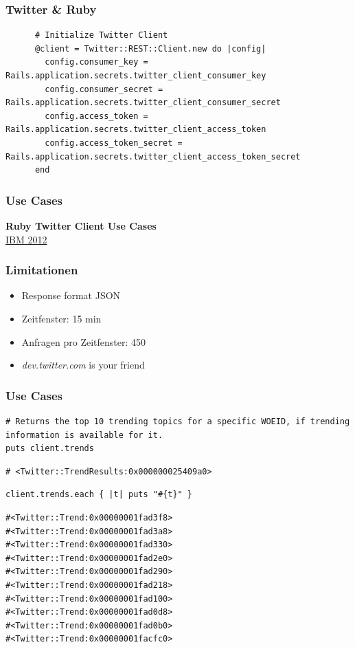 \documentclass{beamer}
\begin{document}
\begin{frame}[fragile]
  \frametitle{Twitter \& Ruby}
    \begin{lstlisting}
      # Initialize Twitter Client
      @client = Twitter::REST::Client.new do |config|
        config.consumer_key = Rails.application.secrets.twitter_client_consumer_key
        config.consumer_secret = Rails.application.secrets.twitter_client_consumer_secret
        config.access_token = Rails.application.secrets.twitter_client_access_token
        config.access_token_secret = Rails.application.secrets.twitter_client_access_token_secret
      end
    \end{lstlisting}    
\end{frame}
\begin{frame}
  \frametitle{Use Cases}\pause
  \begin{center}
    \textbf{Ruby Twitter Client Use Cases}\\
    \hyperlink{http://www.ibm.com/developerworks/library/os-dataminingrubytwitter}{IBM 2012}\pause
  \end{center}
\end{frame}

\begin{frame}
  \frametitle{Limitationen}
  \begin{itemize}
    \item Response format JSON
    \item Zeitfenster: 15 min
    \item Anfragen pro Zeitfenster: 450
    \item \textit{dev.twitter.com} is your friend
  \end{itemize}
\end{frame}

\begin{frame}[fragile]
  \frametitle{Use Cases}
  \begin{lstlisting}
# Returns the top 10 trending topics for a specific WOEID, if trending information is available for it.
puts client.trends
\end{lstlisting}\pause
\begin{lstlisting}
# <Twitter::TrendResults:0x000000025409a0>
\end{lstlisting}\pause
\begin{lstlisting}
client.trends.each { |t| puts "#{t}" }
\end{lstlisting}\pause
\begin{lstlisting}
#<Twitter::Trend:0x00000001fad3f8>
#<Twitter::Trend:0x00000001fad3a8>
#<Twitter::Trend:0x00000001fad330>
#<Twitter::Trend:0x00000001fad2e0>
#<Twitter::Trend:0x00000001fad290>
#<Twitter::Trend:0x00000001fad218>
#<Twitter::Trend:0x00000001fad100>
#<Twitter::Trend:0x00000001fad0d8>
#<Twitter::Trend:0x00000001fad0b0>
#<Twitter::Trend:0x00000001facfc0>
\end{lstlisting}
\end{frame}
\end{document}
